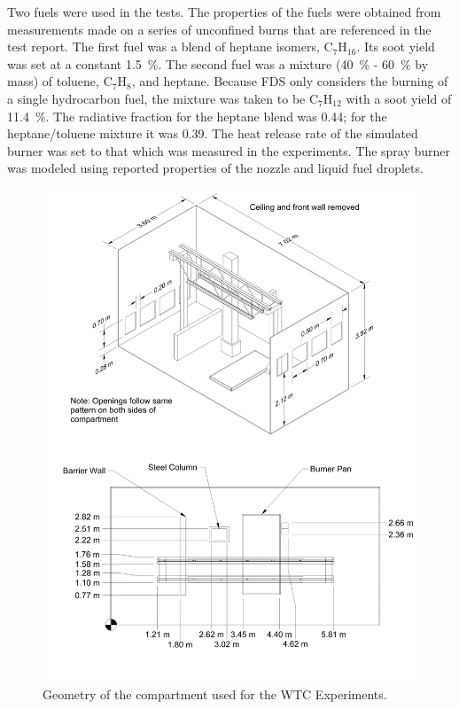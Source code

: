 Two fuels were used in the tests. The properties of the fuels were obtained from measurements made on a series of unconfined burns that are referenced in the test report. The first fuel was a blend of heptane isomers, C$_7$H$_{16}$. Its soot yield was set at a constant 1.5~\%. The second fuel was a mixture (40~\% - 60~\% by mass) of toluene, C$_7$H$_8$, and heptane. Because FDS only considers the burning of a single hydrocarbon fuel, the mixture was taken to be C$_7$H$_{12}$ with a soot yield of 11.4~\%. The radiative fraction for the heptane blend was 0.44; for the heptane/toluene mixture it was 0.39. The heat release rate of the simulated burner was set to that which was measured in the experiments. The spray burner was modeled using reported properties of the nozzle and liquid fuel droplets.

\begin{figure}[p]
\begin{center}
\includegraphics[width=\textwidth]{FIGURES/WTC/WTC}
\end{center}
\caption[Geometry of the WTC Experiments]{Geometry of the compartment used for the WTC Experiments.}
\label{WTC_Drawing}
\end{figure}


